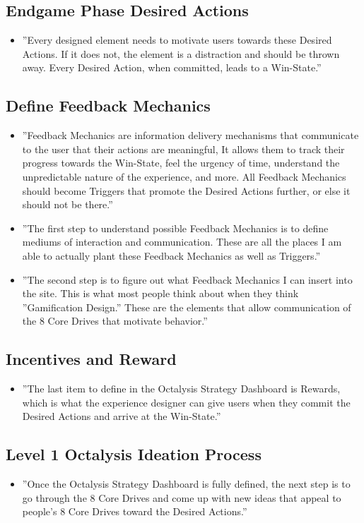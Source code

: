 \subsection{Endgame Phase Desired Actions}
\begin{itemize}
    \item ''Every designed element needs to motivate users towards these Desired Actions. If it does not, the element is a distraction and should be thrown away. Every Desired Action, when committed, leads to a Win-State.''
\end{itemize}

\subsection{Define Feedback Mechanics}
\begin{itemize}
    \item ''Feedback Mechanics are information delivery mechanisms that communicate to the user that their actions are meaningful, It allows them to track their progress towards the Win-State, feel the urgency of time, understand the unpredictable nature of the experience, and more. All Feedback Mechanics should become Triggers that promote the Desired Actions further, or else it should not be there.''
    \item ''The first step to understand possible Feedback Mechanics is to define mediums of interaction and communication. These are all the places I am able to actually plant these Feedback Mechanics as well as Triggers.''
    \item ''The second step is to figure out what Feedback Mechanics I can insert into the site. This is what most people think about when they think ''Gamification Design.'' These are the elements that allow communication of the 8 Core Drives that motivate behavior.''
\end{itemize}

\subsection{Incentives and Reward}
\begin{itemize}
    \item ''The last item to define in the Octalysis Strategy Dashboard is Rewards, which is what the experience designer can give users when they commit the Desired Actions and arrive at the Win-State.''
\end{itemize}

\subsection{Level 1 Octalysis Ideation Process}
\begin{itemize}
    \item ''Once the Octalysis Strategy Dashboard is fully defined, the next step is to go through the 8 Core Drives and come up with new ideas that appeal to people's 8 Core Drives toward the Desired Actions.''
\end{itemize}

